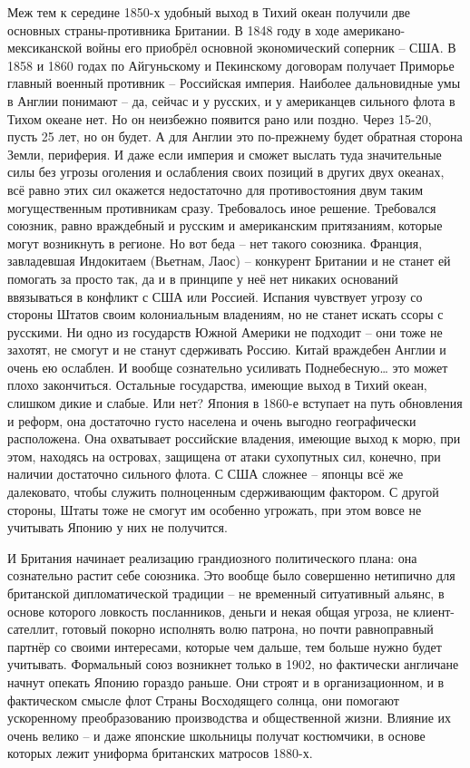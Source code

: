 Меж тем к середине 1850-х удобный выход в Тихий океан получили две основных страны-противника Британии. В 1848 году в ходе американо-мексиканской войны его приобрёл основной экономический соперник – США. В 1858 и 1860 годах по Айгуньскому и Пекинскому договорам получает Приморье главный военный противник – Российская империя. Наиболее дальновидные умы в Англии понимают – да, сейчас и у русских, и у американцев сильного флота в Тихом океане нет. Но он неизбежно появится рано или поздно. Через 15-20, пусть 25 лет, но он будет. А для Англии это по-прежнему будет обратная сторона Земли, периферия. И даже если империя и сможет выслать туда значительные силы без угрозы оголения и ослабления своих позиций в других двух океанах, всё равно этих сил окажется недостаточно для противостояния двум таким могущественным противникам сразу. Требовалось иное решение. Требовался союзник, равно враждебный и русским и американским притязаниям, которые могут возникнуть в регионе. Но вот беда – нет такого союзника. Франция, завладевшая Индокитаем (Вьетнам, Лаос) – конкурент Британии и не станет ей помогать за просто так, да и в принципе у неё нет никаких оснований ввязываться в конфликт с США или Россией. Испания чувствует угрозу со стороны Штатов своим колониальным владениям, но не станет искать ссоры с русскими. Ни одно из государств Южной Америки не подходит – они тоже не захотят, не смогут и не станут сдерживать Россию. Китай враждебен Англии и очень ею ослаблен. И вообще сознательно усиливать Поднебесную… это может плохо закончиться. Остальные государства, имеющие выход в Тихий океан, слишком дикие и слабые. Или нет? Япония в 1860-е вступает на путь обновления и реформ, она достаточно густо населена и очень выгодно географически расположена. Она охватывает российские владения, имеющие выход к морю, при этом, находясь на островах, защищена от атаки сухопутных сил, конечно, при наличии достаточно сильного флота. С США сложнее – японцы всё же далековато, чтобы служить полноценным сдерживающим фактором. С другой стороны, Штаты тоже не смогут им особенно угрожать, при этом вовсе не учитывать Японию у них не получится.

И Британия начинает реализацию грандиозного политического плана: она сознательно растит себе союзника. Это вообще было совершенно нетипично для британской дипломатической традиции – не временный ситуативный альянс, в основе которого ловкость посланников, деньги и некая общая угроза, не клиент-сателлит, готовый покорно исполнять волю патрона, но почти равноправный партнёр со своими интересами, которые чем дальше, тем больше нужно будет учитывать. Формальный союз возникнет только в 1902, но фактически англичане начнут опекать Японию гораздо раньше. Они строят и в организационном, и в фактическом смысле флот Страны Восходящего солнца, они помогают ускоренному преобразованию производства и общественной жизни. Влияние их очень велико – и даже японские школьницы получат костюмчики, в основе которых лежит униформа британских матросов 1880-х.

